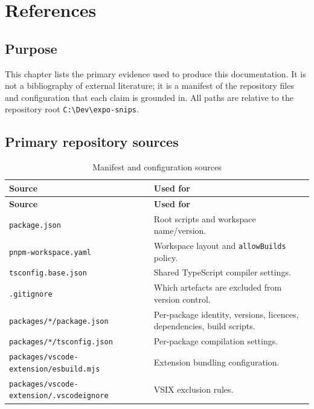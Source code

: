 \chapter{References}
\label{ch:references}

\section{Purpose}

This chapter lists the primary evidence used to produce this documentation. It
is not a bibliography of external literature; it is a manifest of the repository
files and configuration that each claim is grounded in. All paths are relative
to the repository root \texttt{C:\textbackslash Dev\textbackslash expo-snips}.

\section{Primary repository sources}

\begin{longtable}{@{}L{6.2cm}L{8cm}@{}}
\caption{Manifest and configuration sources}\\
\toprule
\textbf{Source} & \textbf{Used for} \\
\midrule
\endfirsthead
\toprule
\textbf{Source} & \textbf{Used for} \\
\midrule
\endhead
\texttt{package.json} & Root scripts and workspace name/version. \\
\texttt{pnpm-workspace.yaml} & Workspace layout and \texttt{allowBuilds} policy. \\
\texttt{tsconfig.base.json} & Shared TypeScript compiler settings. \\
\texttt{.gitignore} & Which artefacts are excluded from version control. \\
\texttt{packages/*/package.json} & Per-package identity, versions, licences,
dependencies, build scripts. \\
\texttt{packages/*/tsconfig.json} & Per-package compilation settings. \\
\texttt{packages/vscode-extension/esbuild.mjs} & Extension bundling configuration. \\
\texttt{packages/vscode-extension/.vscodeignore} & VSIX exclusion rules. \\
\bottomrule
\end{longtable}

